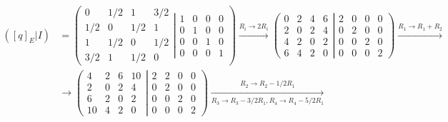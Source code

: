 \documentclass{article}
\begin{document}
\begin{align*}
    ([q]_E | I) & = \left(
    \begin{matrix}
            0   & 1/2 & 1   & 3/2 \\
            1/2 & 0   & 1/2 & 1   \\
            1   & 1/2 & 0   & 1/2 \\
            3/2 & 1   & 1/2 & 0
        \end{matrix}
    \left|
    \begin{matrix}
            1 & 0 & 0 & 0 \\
            0 & 1 & 0 & 0 \\
            0 & 0 & 1 & 0 \\
            0 & 0 & 0 & 1
        \end{matrix}
    \right.
    \right)
    \xrightarrow[]{R_i\rightarrow 2R_i}
    \left(
    \begin{matrix}
            0 & 2 & 4 & 6 \\
            2 & 0 & 2 & 4 \\
            4 & 2 & 0 & 2 \\
            6 & 4 & 2 & 0
        \end{matrix}
    \left|
    \begin{matrix}
            2 & 0 & 0 & 0 \\
            0 & 2 & 0 & 0 \\
            0 & 0 & 2 & 0 \\
            0 & 0 & 0 & 2
        \end{matrix}
    \right.
    \right)
    \xrightarrow[]{R_1\rightarrow R_1+R_2}                                     \\
                & \rightarrow
    \left(
    \begin{matrix}
            4  & 2 & 6 & 10 \\
            2  & 0 & 2 & 4  \\
            6  & 2 & 0 & 2  \\
            10 & 4 & 2 & 0
        \end{matrix}
    \left|
    \begin{matrix}
            2 & 2 & 0 & 0 \\
            0 & 2 & 0 & 0 \\
            0 & 0 & 2 & 0 \\
            0 & 0 & 0 & 2
        \end{matrix}
    \right.
    \right)
    \xrightarrow[R_3\rightarrow R_3-3/2R_1, R_4\rightarrow R_4-5/2R_1]{R_2\rightarrow R_2-1/2R_1}

\end{align*}
\end{document}
